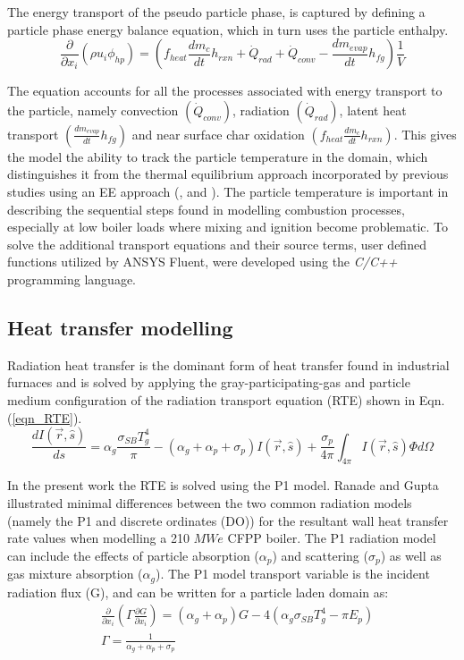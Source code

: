 \documentclass[11pt,cleanfoot]{asme2ej}
\begin{document}
The energy transport of the pseudo particle phase, is captured by defining a particle phase energy balance equation, which in turn uses the particle enthalpy.
\begin{equation}\label{eqn_phi_hp}
\frac{\partial}{\partial x_{i}}( \rho u_{i} \phi_{hp} )=\left( f_{heat}\frac{dm_{c}}{dt}h_{rxn} + \dot{Q}_{rad} + \dot{Q}_{conv} - \frac{dm_{evap}}{dt}h_{fg} \right) \frac{1}{V} 
\end{equation}

The equation accounts for all the processes associated with energy transport to the particle, namely convection $\left(\dot{Q}_{conv}\right)$, radiation $\left(\dot{Q}_{rad}\right)$, latent heat transport $\left(\frac{dm_{evap}}{dt}h_{fg}\right)$ and near surface char oxidation $\left(f_{heat}\frac{dm_{c}}{dt}h_{rxn}\right)$. This gives the model the ability to track the particle temperature in the domain, which distinguishes it from the thermal equilibrium approach incorporated by previous studies using an EE approach (\cite{Benim2005}, \cite{Vicente2003} and \cite{Cai2015}). The particle temperature is important in describing the sequential steps found in modelling combustion processes, especially at low boiler loads where mixing and ignition become problematic. To solve the additional transport equations and their source terms, user defined functions utilized by ANSYS Fluent, were developed using the \textit{C/C++} programming language.
\subsection{Heat transfer modelling}
Radiation heat transfer is the dominant form of heat transfer found in industrial furnaces \cite{Basu2000} and is solved by applying the gray-participating-gas and particle medium configuration of the radiation transport equation (RTE) \cite{Modest2013} shown in Eqn. (\ref{eqn_RTE}).
\begin{equation}\label{eqn_RTE}
\frac{d I(\vec{r},\hat{s})}{ds} = \alpha_g \frac{\sigma_{SB} T_{g}^4}{\pi}-(\alpha_g+\alpha_p+\sigma_p)I(\vec{r},\hat{s}) + \frac{\sigma_p}{4\pi}\int_{4\pi}I(\vec{r},\hat{s})\Phi d \Omega
\end{equation}

In the present work the RTE is solved using the P1 model. Ranade and Gupta \cite{Ranade2015} illustrated minimal differences between the two common radiation models (namely the P1 and discrete ordinates (DO)) for the resultant wall heat transfer rate values when modelling a 210 $MWe$ CFPP boiler. The P1 radiation model can include the effects of particle absorption ($\alpha_p$) and scattering ($\sigma_p$) as well as gas mixture absorption ($\alpha_g$). The P1 model transport variable is the incident radiation flux (G), and can be written for a particle laden domain as:
\begin{equation}
\begin{split}
&\frac{\partial}{\partial x_{i}}\left(\Gamma\frac{\partial G}{\partial x_{i}}\right)=\left(\alpha_g+\alpha_p\right)G-4\left(\alpha_g \sigma_{SB} T_{g}^4-\pi E_p \right)\\
&\Gamma = \frac{1}{\alpha_g+\alpha_p+\sigma_p}
\end{split}
\end{equation}
\end{document}
